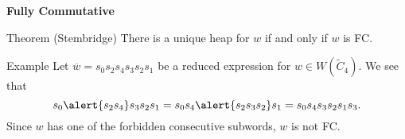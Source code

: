 \documentclass{beamer}
\newcommand{\w}{\overline{w}}
\newcommand{\C}{\widetilde{C}}
\newcommand\heapblock[4]{\fill[fill=#4, fill opacity=0.35, draw=#4, line width=1.1pt, rounded corners,shift={(\xxaxis:#1)},shift={(\yyaxis:#2)}] (-1,-1) rectangle (1,1);\node at (#1,#2) {\footnotesize $#3$};}
\newcommand\xxaxis{0}
\newcommand\yyaxis{90}
\begin{document}
\begin{frame}{\textbf{Fully Commutative}}
\begin{block}{Theorem (Stembridge)}
	There is a unique heap for $w$ if and only if $w$ is FC.
\end{block}
\pause
\begin{block}{Example}
	Let $\w=s_0s_2s_4s_3s_2s_1$ be a reduced expression for $w \in W(\C_4)$. We see that
	\[s_0\alert{s_2s_4}s_3s_2s_1=s_0s_4\alert{s_2s_3s_2}s_1=s_0s_4s_3s_2s_1s_3.\]
	Since $w$ has one of the forbidden consecutive subwords, $w$ is \alert{not} FC.
\pause
\begin{columns}
\begin{column}{0.4\textwidth}
\begin{figure}\centering
{}
\end{figure}
\end{column}

\begin{column}{0.4\textwidth}
\begin{figure}\centering
{}
\end{figure}
\end{column}
\end{columns}


\end{block}


	
\end{frame}

\end{document}
